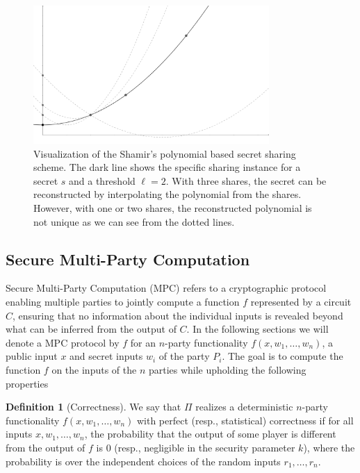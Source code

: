 \documentclass[11pt]{report}
\theoremstyle{definition}
\newtheorem{definition}{Definition}[section]
\theoremstyle{plain}
\begin{document}
\begin{figure}
  \centering
  \includegraphics[width=0.8\textwidth]{images/shamir.png}
  \caption{Visualization of the Shamir's polynomial based secret sharing scheme. The dark line shows the specific sharing instance for a secret $s$ and a threshold $\ell=2$. With three shares, the secret can be reconstructed by interpolating the polynomial from the shares. However, with one or two shares, the reconstructed polynomial is not unique as we can see from the dotted lines.}\label{fig:shamir}
\end{figure}

\subsection{Secure Multi-Party Computation}\label{sec:mpc}

Secure Multi-Party Computation (MPC) refers to a cryptographic protocol enabling multiple parties to jointly compute a function $f$ represented by a circuit $C$, ensuring that no information about the individual inputs is revealed beyond what can be inferred from the output of $C$. In the following sections we will denote a MPC protocol by $f$ for an $n$-party functionality $f(x, w_1, \dots, w_n)$, a public input $x$ and secret inputs $w_i$ of the party $P_i$. The goal is to compute the function $f$ on the inputs of the $n$ parties while upholding the following properties~\cite{cramer2015secure}

\begin{definition}[Correctness]\label{def:mpc-correctness}
  We say that $\Pi$ realizes a deterministic $n$-party functionality $f(x, w_1, \dots, w_n)$ with perfect (resp., statistical) correctness if for all inputs $x, w_1, \dots, w_n$, the probability that the output of some player is different from the output of $f$ is $0$ (resp., negligible in the security parameter $k$), where the probability is over the independent choices of the random inputs $r_1, \dots, r_n$.
\end{definition}
\end{document}
